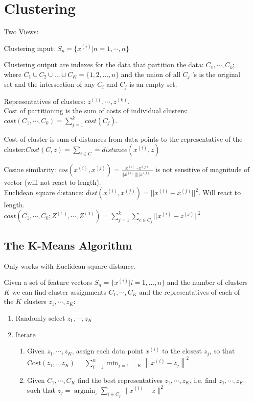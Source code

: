 \section{Clustering}

Two Views:

Clustering input: $S_n = \{x^{(i)}|n=1,\cdots,n\}$

Clustering output are indexes for the data that partition the data: $C_1,\cdots,C_k$; where $C_1 \cup C_2 \cup ... \cup C_ K = \big \{  1, 2, ..., n \big \}$ and the union of all  $C_j$ 's is the original set and the intersection of any  $C_i$  and  $C_j$  is an empty set.

Representatives of clusters: $z^{(1)},\cdots,z^{(k)}$.\\

Cost of partitioning is the sum of costs of individual clusters: $cost(C_1,\cdots,C_k) = \sum_{j=1}^k cost (C_j)$. 

Cost of cluster is sum of distances from data points to the representative of the cluster:$Cost(C,z) = \sum_{i \in C} = distance(x^{(i)},z)$

Cosine similarity: $cos(x^{(i)},x^{(j)}) = \frac{x^{(i)} \cdot x^{(j)}}{||x^{(i)}|| ||x^{(j)}||}$ is not sensitive of magnitude of vector (will not react to length).\\

Euclidean square distance: $dist(x^{(i)},x^{(j)})= ||x^{(i)}-x^{(j)}||^2$. Will react to length.\\

$cost(C_1,\cdots,C_k; Z^{(1)},\cdots,Z^{(1)}) = \sum_{j=1}^k \sum_{c \in C_j} ||x^{(i)}-z^{(j)}||^2 $

\subsection{The K-Means Algorithm}

Only works with Euclidean square distance.

Given a set of feature vectors $S_ n = \big \{ x^{(i)}| i = 1,...,n\big \}$ and the number of clusters  $K$ we can find cluster assignments  $C_1,\cdots,C_K$ and the representatives of each of the $K$ clusters $z_1,\cdots,z_K$:\\


\begin{enumerate}
\item Randomly select $z_1,\cdots,z_K$
\item Iterate
\begin{enumerate}
\item Given $z_1,\cdots,z_K$, assign each data point $x^{(i)}$ to the closest $z_j$, so that $\text {Cost}(z_1, ... z_ K) = \sum _{i=1}^{n} \min _{j=1,...,K} \left\|  x^{(i)} - z_ j \right\| ^2$
\item Given $C_1,\cdots,C_K$ find the best representatives $z_1,\cdots,z_K$, i.e. find $z_1,\cdots,z_K$ such that $\displaystyle z_ j=\operatorname {argmin}_{z} \sum _{i \in C_ j} \| x^{(i)} - z \| ^2$
\end{enumerate}
\end{enumerate}

